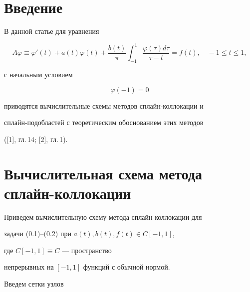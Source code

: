 \label{begin}








\section*{Введение}





В данной статье для уравнения


\begin{equation}


A\varphi \equiv \varphi'(t)+a(t)\varphi (t)+\frac{b(t)}{\pi}\int_{-1}^1


\frac{\varphi (\tau)d\tau}{\tau-t}=f(t),\quad -1\leq t\leq 1,


\tag{0.1}


\end{equation}


с начальным условием


\begin{equation}


\varphi(-1)=0


\tag{0.2}


\end{equation}


приводятся вычислительные схемы методов сплайн-коллокации и 


сплайн-подобластей с теоретическим обоснованием этих методов


([1], гл.\,14; [2], гл.\,1).





\section{Вычислительная схема метода сплайн-коллокации}





Приведем вычислительную схему метода сплайн-коллокации для 


задачи (0.1)--(0.2) при $a(t), b(t), f(t)\in C[-1,1]$,


где $C[-1,1]\equiv C$ --- пространство 


непрерывных на $[-1,1]$ функций с обычной нормой.





Введем сетки узлов



